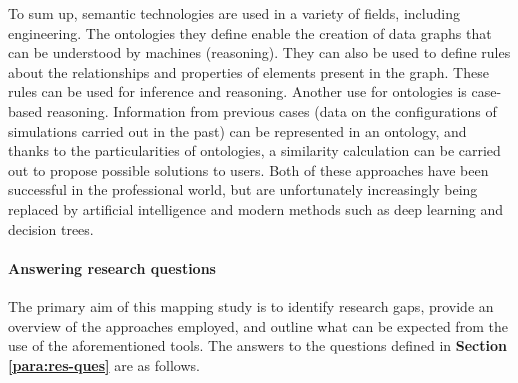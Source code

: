             To sum up, semantic technologies are used in a variety of fields, including engineering. The ontologies they define enable the creation of data graphs that can be understood by machines (reasoning). They can also be used to define rules about the relationships and properties of elements present in the graph. These rules can be used for inference and reasoning. Another use for ontologies is case-based reasoning. Information from previous cases (data on the configurations of simulations carried out in the past) can be represented in an ontology, and thanks to the particularities of ontologies, a similarity calculation can be carried out to propose possible solutions to users. Both of these approaches have been successful in the professional world, but are unfortunately increasingly being replaced by artificial intelligence and modern methods such as deep learning and decision trees.\\

            
            \paragraph{Answering research questions\label{para:sms_ans_rq}}
            The primary aim of this mapping study is to identify research gaps, provide an overview of the approaches employed, and outline what can be expected from the use of the aforementioned tools. The answers to the questions defined in \textbf{Section \ref{para:res-ques}} are as follows.\\

